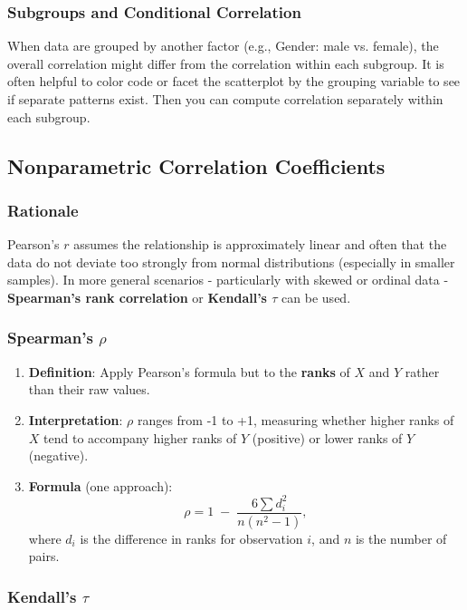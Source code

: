 \documentclass[10pt, total={6in, 8in}]{extarticle}
\begin{document}
\subsubsection{Subgroups and Conditional Correlation}

When data are grouped by another factor (e.g., Gender: male vs. female), the overall correlation might differ from the correlation within each subgroup. It is often helpful to color code or facet the scatterplot by the grouping variable to see if separate patterns exist. Then you can compute correlation separately within each subgroup.


\subsection{Nonparametric Correlation Coefficients}

\subsubsection{Rationale}

Pearson's $r$ assumes the relationship is approximately linear and often that the data do not deviate too strongly from normal distributions (especially in smaller samples). In more general scenarios - particularly with skewed or ordinal data - \textbf{Spearman's rank correlation} or \textbf{Kendall's $\tau$} can be used.

\subsubsection{Spearman's $\rho$}

\begin{enumerate}
    \item \textbf{Definition}: Apply Pearson's formula but to the \textbf{ranks} of $X$ and $Y$ rather than their raw values.
    \item \textbf{Interpretation}: $\rho$ ranges from -1 to +1, measuring whether higher ranks of $X$ tend to accompany higher ranks of $Y$ (positive) or lower ranks of $Y$ (negative).
    \item \textbf{Formula} (one approach):
          \[
              \rho = 1 \;-\; \frac{6 \sum d_i^2}{n (n^2 - 1)},
          \]
          where $d_i$ is the difference in ranks for observation $i$, and $n$ is the number of pairs.
\end{enumerate}

\subsubsection{Kendall's $\tau$}
\end{document}
